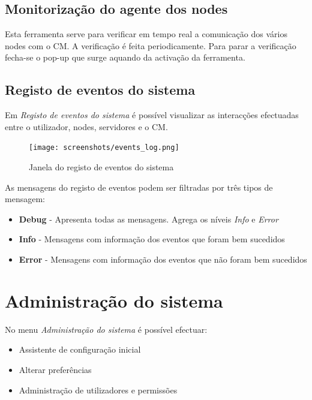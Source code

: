 \subsection{Monitorização do agente dos nodes}
Esta ferramenta serve para verificar em tempo real a comunicação dos vários nodes com o CM. A verificação é feita periodicamente.
Para parar a verificação fecha-se o pop-up que surge aquando da activação da ferramenta.

\subsection{Registo de eventos do sistema}
\label{sec:system_event_reg}

Em \emph{Registo de eventos do sistema} é possível visualizar as interacções efectuadas entre o utilizador, nodes, servidores e o CM.

\begin{figure}[H]
	\begin{center}
	\texttt{[image: screenshots/events\_log.png]}
	\caption{Janela do registo de eventos do sistema}
	\label{fig:events_log}
	\end{center}
\end{figure}

As mensagens do registo de eventos podem ser filtradas por três tipos de mensagem:
\begin{itemize}
    \item {\bf Debug} - Apresenta todas as mensagens. Agrega os níveis \emph{Info} e \emph{Error}
    \item {\bf Info} - Mensagens com informação dos eventos que foram bem sucedidos
    \item {\bf Error} - Mensagens com informação dos eventos que não foram bem sucedidos
\end{itemize}

\section{Administração do sistema}
\label{sec:first_time_wizard}
No menu \emph{Administração do sistema} é possível efectuar:
\begin{itemize}
\item Assistente de configuração inicial
\item Alterar preferências
\item Administração de utilizadores e permissões
\end{itemize}

